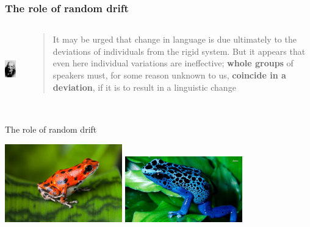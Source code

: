 \documentclass[compress]{beamer}
\begin{document}
\begin{frame}
\frametitle{The role of random drift}
\begin{columns}[T]  
   \begin{column}{.2\textwidth}
  	  \vspace{12pt}
	  \includegraphics[height=1.2in]{bloomfield.jpg}   
   \end{column}
   \begin{column}{.8\textwidth}
      \begin{block}{}
      \begin{quote}
It may be urged that change in language is due ultimately to the deviations of individuals from the rigid system. But it appears that even here individual variations are ineffective; \textbf{whole groups} of speakers must, for some reason unknown to us, \textbf{coincide in a deviation}, if it is to result in a linguistic change
      \end{quote}
	\end{block}
    \end{column}
  \end{columns}
 \vfill\hfill \citep{bloomfield1927}
\end{frame}



\begin{frame}{The role of random drift}
\begin{center}
 \includegraphics[width=2in]{red-frog.jpg} \hspace{1cm}  \includegraphics[width=2in]{blue-frog.jpg}
\end{center}
\end{frame}
\end{document}

